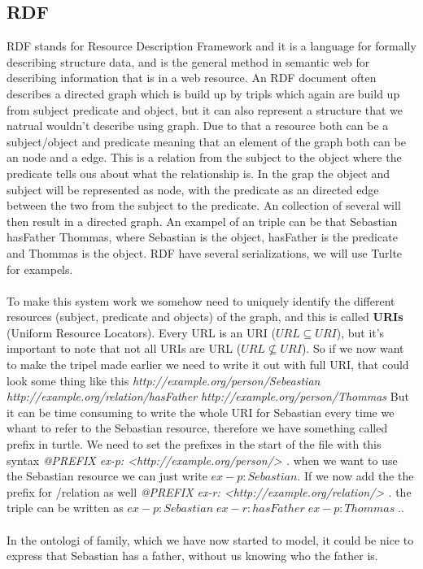 \subsection{RDF}
RDF stands for Resource Description Framework and it is a language for formally describing structure data, 
and is the general method in semantic web for describing information that is in a web resource. An RDF document often describes 
a directed graph which is build up by tripls which again are build up from subject predicate and object, but it can also represent 
a structure that we natrual wouldn't describe using graph. Due to that a resource both can be a subject/object and predicate
meaning that an element of the graph both can be an node and a edge. This is a relation 
from the subject to the object where the predicate tells ous about what the relationship is. In the grap the object 
and subject will be represented as node, with the predicate as an directed edge between the two from the subject to the predicate.
An collection of several will then result in a directed graph. An exampel of an triple can be that Sebastian hasFather Thommas, where 
Sebastian is the object, hasFather is the predicate and Thommas is the object. RDF have several serializations, we will use Turlte for exampels. 
\\ \\
To make this system work we somehow need to uniquely identify the different resources (subject, predicate and objects) of the graph, 
and this is called \textbf{URIs} (Uniform Resource Locators). Every URL is an URI ($URL\subseteq URI$), but it's important to note that 
not all URIs are URL ($URL\nsubseteq URI$). So if we now want to make the tripel made earlier we need to write it out with full URI, that could look 
some thing like this \textit{http://example.org/person/Sebeastian http://example.org/relation/hasFather http://example.org/person/Thommas}
But it can be time consuming to write the whole URI for Sebastian every time we whant to refer to the Sebastian resource, therefore we have something called prefix in 
turtle. We need to set the prefixes in the start of the file with this syntax \textit{@PREFIX ex-p: <http://example.org/person/> .} when we want 
to use the Sebastian resource we can just write $ex-p:Sebastian$. If we now add the the prefix for /relation as well \textit{@PREFIX ex-r: <http://example.org/relation/> .} 
the triple can be written as $ex-p:Sebastian\; ex-r:hasFather\; ex-p:Thommas\; .$.
\\ \\ 
In the ontologi of family, which we have now started to model, it could be nice to express that Sebastian has a father, without us knowing who the father is. 
